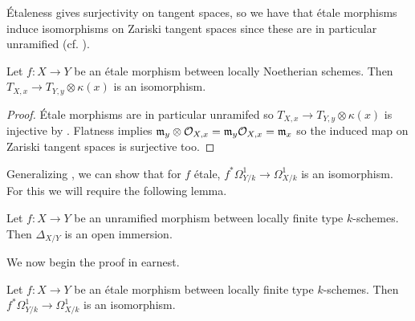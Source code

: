 \'{E}taleness gives surjectivity on tangent spaces, so we have that \'{e}tale morphisms induce isomorphisms on Zariski tangent spaces since these are in particular unramified (cf. ). 
\begin{lemma}\label{lem: etale is local diffeo}
    Let $f:X\to Y$ be an \'{e}tale morphism between locally Noetherian schemes. Then $T_{X,x}\to T_{Y,y}\otimes\kappa(x)$ is an isomorphism. 
\end{lemma}
\begin{proof}
    \'{E}tale morphisms are in particular unramifed so $T_{X,x}\to T_{Y,y}\otimes\kappa(x)$ is injective by . Flatness implies $\mathfrak{m}_{y}\otimes\mathcal{O}_{X,x}=\mathfrak{m}_{y}\mathcal{O}_{X,x}=\mathfrak{m}_{x}$ so the induced map on Zariski tangent spaces is surjective too. 
\end{proof}
Generalizing , we can show that for $f$ \'{e}tale, $f^{*}\Omega_{Y/k}^{1}\to\Omega_{X/k}^{1}$ is an isomorphism. For this we will require the following lemma. 
\begin{lemma}\label{lem: unramified implies open relative diagonal}
    Let $f:X\to Y$ be an unramified morphism between locally finite type $k$-schemes. Then $\Delta_{X/Y}$ is an open immersion. 
\end{lemma}
We now begin the proof in earnest. 
\begin{proposition}\label{prop: etale implies isomorphic differentials}
    Let $f:X\to Y$ be an \'{e}tale morphism between locally finite type $k$-schemes. Then $f^{*}\Omega_{Y/k}^{1}\to\Omega_{X/k}^{1}$ is an isomorphism. 
\end{proposition}
